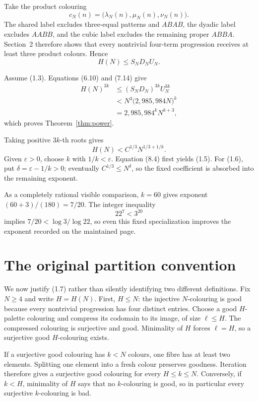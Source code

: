 \documentclass[11pt]{article}
\theoremstyle{definition}
\newcommand{\siteH}{H}
\begin{document}
Take the product colouring
\[
 c_N(n)=\bigl(\lambda_N(n),\mu_N(n),\nu_N(n)\bigr).
 \tag{8.1}
\]
The shared label excludes three-equal patterns and \(ABAB\), the dyadic
label excludes \(AABB\), and the cubic label excludes the remaining proper
\(ABBA\).  Section~2 therefore shows that every nontrivial four-term
progression receives at least three product colours.  Hence
\[
 \siteH(N)\leq S_ND_NU_N.
 \tag{8.2}
\]

Assume (1.3).  Equations (6.10) and (7.14) give
\[
\begin{aligned}
 \siteH(N)^{3k}
 &\leq(S_ND_N)^{3k}U_N^{3k}\\
 &<N^3\bigl(2{,}985{,}984N\bigr)^k\\
 &=2{,}985{,}984^kN^{k+3},
\end{aligned}
\tag{8.3}
\]
which proves Theorem~\ref{thm:power}.

Taking positive \(3k\)-th roots gives
\[
 \siteH(N)<C^{1/3}N^{1/3+1/k}.
 \tag{8.4}
\]
Given \(\varepsilon>0\), choose \(k\) with \(1/k<\varepsilon\).  Equation
(8.4) first yields (1.5).  For (1.6), put
\(\delta=\varepsilon-1/k>0\); eventually
\(C^{1/3}\leq N^\delta\), so the fixed coefficient is absorbed into the
remaining exponent.

As a completely rational visible comparison, \(k=60\) gives exponent
\((60+3)/(180)=7/20\).  The integer inequality
\[
 22^7<3^{20}
 \tag{8.5}
\]
implies
\(7/20<\log3/\log22\), so even this fixed specialization improves the
exponent recorded on the maintained page.

\section{The original partition convention}

We now justify (1.7) rather than silently identifying two different
definitions.  Fix \(N\geq4\) and write \(H=\siteH(N)\).  First,
\(H\leq N\): the injective \(N\)-colouring is good because every nontrivial
progression has four distinct entries.  Choose a good \(H\)-palette
colouring and compress its codomain to its image, of size \(\ell\leq H\).
The compressed colouring is surjective and good.  Minimality of \(H\) forces
\(\ell=H\), so a surjective good \(H\)-colouring exists.

If a surjective good colouring has \(k<N\) colours, one fibre has at least
two elements.  Splitting one element into a fresh colour preserves goodness.
Iteration therefore gives a surjective good colouring for every
\(H\leq k\leq N\).  Conversely, if \(k<H\), minimality of \(H\) says that
no \(k\)-colouring is good, so in particular every surjective
\(k\)-colouring is bad.
\end{document}
